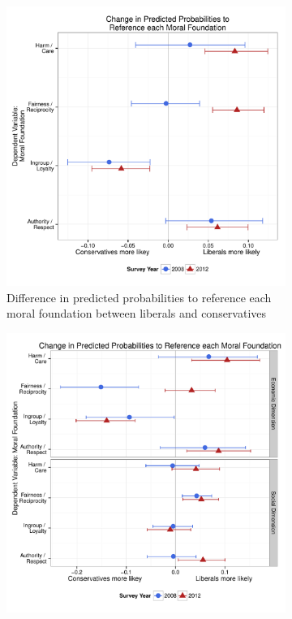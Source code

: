 \documentclass[12pt]{article}
\begin{document}
\begin{figure}[ht]
  \centering
  \caption{INSERT DESCRIPTION}
  \begin{subfigure}[t]{0.49\textwidth}
    \includegraphics[scale=.35]{../calc/fig/appD1ideol.pdf}
    \caption{Difference in predicted probabilities to reference each moral foundation between liberals and conservatives}\label{fig:appD1ideol}
  \end{subfigure}
  \begin{subfigure}[t]{0.49\textwidth}
    \includegraphics[scale=.35]{../calc/fig/appD2soceco.pdf}

\end{subfigure}
\end{figure}
\end{document}
